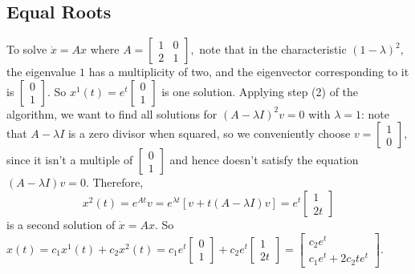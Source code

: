 \subsection{Equal Roots}
To solve $\dot x=Ax$ where $A=
\begin{bmatrix}
    1 & 0 \\ 2 & 1
\end{bmatrix},$ note that in the characteristic $(1-\lambda )^2$, the eigenvalue $1$ has a multiplicity of two, and the eigenvector corresponding to it is $
\begin{bmatrix}
   0\\1 
\end{bmatrix}$. So $x^1(t)=e^{t}
\begin{bmatrix}
    0\\1
\end{bmatrix}$ is one solution. Applying step (2) of the algorithm, we want to find all solutions for $(A-\lambda I)^2v=0$ with $\lambda=1$: note that $A-\lambda I$ is a zero divisor when squared, so we conveniently choose $v=
\begin{bmatrix}
    1\\0
\end{bmatrix},$ since it isn't a multiple of $
\begin{bmatrix}
    0\\1
\end{bmatrix}$ and hence doesn't satisfy the equation $(A-\lambda I)v=0$. Therefore, \[
x^2(t)=e^{At}v=e^{\lambda t}\left[ v+t(A-\lambda I)v \right] =e^{t}
\begin{bmatrix}
    1\\2t
\end{bmatrix}
\] is a second solution of $\dot x=Ax$. So $x(t)=c_1x^1(t)+c_2x^2(t)=
c_1e^{t}
\begin{bmatrix}
0\\1
\end{bmatrix}+c_2e^{t}
\begin{bmatrix}
    1\\2t
\end{bmatrix}=
\begin{bmatrix}
   c_2e^{t}\\c_1e^{t}+2c_2te^{t} 
\end{bmatrix}.$ 
